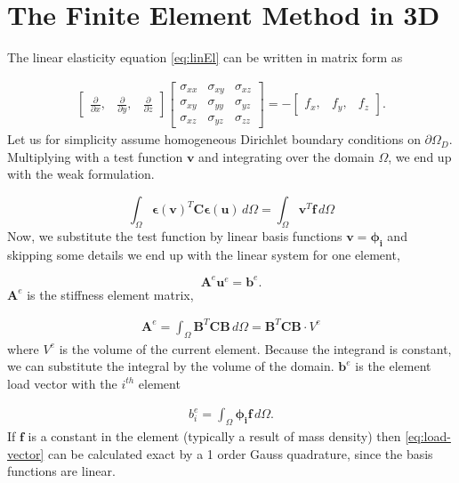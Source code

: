 \section{The Finite Element Method in 3D}
\label{sec:FEM}

The linear elasticity equation \eqref{eq:linEl} can be written in matrix form as

\begin{align*}
\begin{bmatrix}
\frac{\partial}{\partial x}, & \frac{\partial}{\partial y}, & \frac{\partial}{\partial z}
\end{bmatrix}
\begin{bmatrix}
\sigma_{xx} & \sigma_{xy} & \sigma_{xz} \\
\sigma_{xy} & \sigma_{yy} & \sigma_{yz} \\
\sigma_{xz} & \sigma_{yz} & \sigma_{zz}
\end{bmatrix} = -
\begin{bmatrix}
f_x, & f_y, & f_z 
\end{bmatrix}.
\end{align*}
Let us for simplicity assume homogeneous Dirichlet boundary conditions on $\partial \Omega_D$. Multiplying with a test function $\bm{v}$ and integrating over the domain $\Omega$, we end up with the weak formulation. 

\begin{equation}
\int_\Omega \bm{\epsilon}(\bm{v})^T \bm{C} \bm{\epsilon}(\bm{u}) \, d\Omega = \int_\Omega \bm{v}^T \bm{f} \, d\Omega
\end{equation}
Now, we substitute the test function by linear basis functions $\bm{v} = \bm{\phi_i}$ and skipping some details we end up with the linear system for one element,

\begin{equation}
\label{eq:linear-system}
\bm{A}^e \bm{u}^e = \bm{b}^e.
\end{equation}
$\bm{A}^e$ is the stiffness element matrix,

\begin{align}
\bm{A}^e = \int_\Omega \bm{B}^T \bm{C} \bm{B} \, d\Omega = \bm{B}^T \bm{C} \bm{B} \cdot V^e
\end{align}
where $V^e$ is the volume of the current element. Because the integrand is constant, we can substitute the integral by the volume of the domain. $\bm{b}^e$ is the element load vector with the $i^{th}$ element 

\begin{align}
\label{eq:load-vector}
b^e_i = 
\int_{\Omega} \bm{\phi_i} \bm{f} \, d\Omega.
\end{align}
If $\bm{f}$ is a constant in the element (typically a result of mass density) then \eqref{eq:load-vector} can be calculated exact by a 1 order Gauss quadrature, since the basis functions are linear. 

